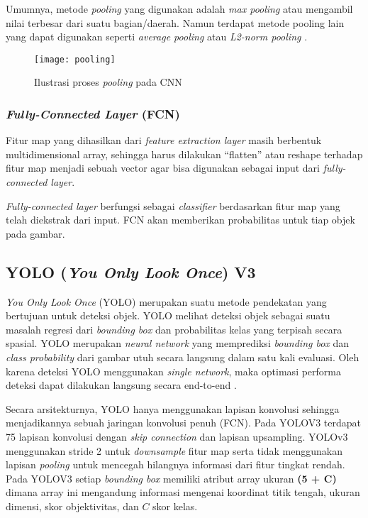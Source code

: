 \documentclass[../thesis.tex]{subfiles}
\begin{document}
Umumnya, metode \textit{pooling} yang digunakan adalah \textit{max pooling} atau mengambil nilai terbesar dari suatu bagian/daerah. Namun terdapat metode pooling lain yang dapat digunakan seperti \textit{average pooling} atau
\textit{L2-norm pooling} \cite{CNNinImageNet}.
\begin{figure}[htp]
	\centering
	\texttt{[image: pooling]}
	\caption{Ilustrasi proses \textit{pooling} pada CNN}
	\label{pooling_CNN}
\end{figure}

\subsubsection{\textit{Fully-Connected Layer} (FCN)}
Fitur map yang dihasilkan dari \textit{feature extraction layer} masih berbentuk multidimensional array, sehingga harus dilakukan “flatten” atau reshape terhadap fitur map menjadi sebuah vector agar bisa digunakan sebagai input dari \textit{fully-connected layer}.

\textit{Fully-connected layer} berfungsi sebagai \textit{classifier} berdasarkan fitur map yang telah diekstrak dari input. FCN akan memberikan probabilitas untuk tiap objek pada gambar.

\subsection{YOLO (\textit{You Only Look Once}) V3}

\textit{You Only Look Once} (YOLO) merupakan suatu metode pendekatan yang bertujuan untuk deteksi objek. YOLO melihat deteksi objek sebagai suatu masalah regresi dari \textit{bounding box} dan
probabilitas kelas yang terpisah secara spasial. YOLO merupakan \textit{neural network} yang memprediksi \textit{bounding box} dan \textit{class probability} dari gambar utuh secara langsung dalam satu kali
evaluasi. Oleh karena deteksi YOLO menggunakan \textit{single network}, maka optimasi performa deteksi dapat dilakukan langsung secara end-to-end \cite{YoloV1}.

Secara arsitekturnya, YOLO hanya menggunakan lapisan konvolusi sehingga menjadikannya sebuah jaringan konvolusi penuh (FCN). Pada YOLOV3 terdapat 75 lapisan konvolusi dengan \textit{skip connection} dan lapisan upsampling.
YOLOv3 menggunakan stride 2 untuk \textit{downsample} fitur map serta tidak menggunakan lapisan \textit{pooling} untuk mencegah hilangnya informasi dari fitur tingkat rendah. Pada YOLOV3 setiap \textit{bounding box} memiliki atribut array ukuran \textbf{(5 + C)} dimana array ini mengandung informasi
mengenai koordinat titik tengah, ukuran dimensi, skor objektivitas, dan $C$ skor kelas.
\end{document}
